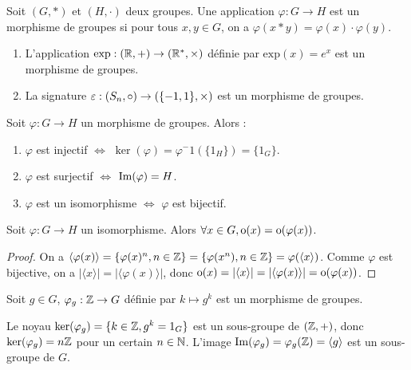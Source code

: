 \documentclass[11pt,a4paper]{report}
\begin{document}
\begin{definition}
    Soit $(G,*)$ et $(H,\cdot)$ deux groupes. Une application $\varphi: G \to H$ est un morphisme de groupes si pour tous $x, y \in G$, on a $\varphi(x * y) = \varphi(x) \cdot \varphi(y)$.
\end{definition}

\begin{example}
    \begin{enumerate}
        \item L'application $\mathrm{exp} : (\mathbb{R},+) \to (\mathbb{R}^*,\times)$ définie par $\mathrm{exp}(x) = e^x$ est un morphisme de groupes.
        \item La signature $\varepsilon : (S_n, \circ) \to (\{ -1, 1 \}, \times)$ est un morphisme de groupes.
    \end{enumerate}
\end{example}

\begin{property}
    Soit $\varphi: G \to H$ un morphisme de groupes. Alors :
    \begin{enumerate}
        \item $\varphi$ est injectif $\iff$ $\ker(\varphi) = \varphi^-1(\{1_H\})= \{ 1_G \}$.
        \item $\varphi$ est surjectif $\iff$ $\mathrm{Im}(\varphi) = H$.
        \item $\varphi$ est un isomorphisme $\iff$ $\varphi$ est bijectif.
    \end{enumerate}
\end{property}

\begin{property}
    Soit $\varphi : G \to H$ un isomorphisme. Alors $\forall x \in G, \mathrm{o}(x) = \mathrm{o}(\varphi(x))$.
\end{property}

\begin{proof}
    On a $\langle \varphi(x) \rangle = \{ \varphi(x)^n, n \in \mathbb{Z} \} = \{ \varphi(x^n), n \in \mathbb{Z} \} = \varphi(\langle x \rangle)$. Comme $\varphi$ est bijective, on a $|\langle x \rangle| = |\langle \varphi(x) \rangle|$, donc $\mathrm{o}(x) = |\langle x \rangle| = |\langle \varphi(x) \rangle| = \mathrm{o}(\varphi(x))$.
\end{proof}


\begin{example}
    Soit $g \in G$, $\varphi_g : \mathbb{Z} \to G$ définie par $k \mapsto g^k$ est un morphisme de groupes.

    Le noyau $\ker(\varphi_g) = \{ k \in \mathbb{Z}, g^k = 1_G \}$ est un sous-groupe de $(\mathbb{Z},+)$, donc $\ker(\varphi_g) = n \mathbb{Z}$ pour un certain $n \in \mathbb{N}$. L'image $\mathrm{Im}(\varphi_g) = \varphi_g(\mathbb{Z}) = \langle g \rangle$ est un sous-groupe de $G$.
\end{example}
\end{document}
